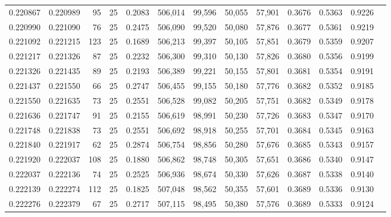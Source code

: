 \begin{tabular}{rrrrrrrrrrrrr}
0.220867 & 0.220989 &    95 &  25 &                                     0.2083 & 506,014 &  99,596 &  50,055 &  57,901 & 0.3676 & 0.5363 & 0.9226 \\
0.220990 & 0.221090 &    76 &  25 &                                     0.2475 & 506,090 &  99,520 &  50,080 &  57,876 & 0.3677 & 0.5361 & 0.9219 \\
0.221092 & 0.221215 &   123 &  25 &                                     0.1689 & 506,213 &  99,397 &  50,105 &  57,851 & 0.3679 & 0.5359 & 0.9207 \\
0.221217 & 0.221326 &    87 &  25 &                                     0.2232 & 506,300 &  99,310 &  50,130 &  57,826 & 0.3680 & 0.5356 & 0.9199 \\
0.221326 & 0.221435 &    89 &  25 &                                     0.2193 & 506,389 &  99,221 &  50,155 &  57,801 & 0.3681 & 0.5354 & 0.9191 \\
0.221437 & 0.221550 &    66 &  25 &                                     0.2747 & 506,455 &  99,155 &  50,180 &  57,776 & 0.3682 & 0.5352 & 0.9185 \\
0.221550 & 0.221635 &    73 &  25 &                                     0.2551 & 506,528 &  99,082 &  50,205 &  57,751 & 0.3682 & 0.5349 & 0.9178 \\
0.221636 & 0.221747 &    91 &  25 &                                     0.2155 & 506,619 &  98,991 &  50,230 &  57,726 & 0.3683 & 0.5347 & 0.9170 \\
0.221748 & 0.221838 &    73 &  25 &                                     0.2551 & 506,692 &  98,918 &  50,255 &  57,701 & 0.3684 & 0.5345 & 0.9163 \\
0.221840 & 0.221917 &    62 &  25 &                                     0.2874 & 506,754 &  98,856 &  50,280 &  57,676 & 0.3685 & 0.5343 & 0.9157 \\
0.221920 & 0.222037 &   108 &  25 &                                     0.1880 & 506,862 &  98,748 &  50,305 &  57,651 & 0.3686 & 0.5340 & 0.9147 \\
0.222037 & 0.222136 &    74 &  25 &                                     0.2525 & 506,936 &  98,674 &  50,330 &  57,626 & 0.3687 & 0.5338 & 0.9140 \\
0.222139 & 0.222274 &   112 &  25 &                                     0.1825 & 507,048 &  98,562 &  50,355 &  57,601 & 0.3689 & 0.5336 & 0.9130 \\
0.222276 & 0.222379 &    67 &  25 &                                     0.2717 & 507,115 &  98,495 &  50,380 &  57,576 & 0.3689 & 0.5333 & 0.9124 \\

\end{tabular}
